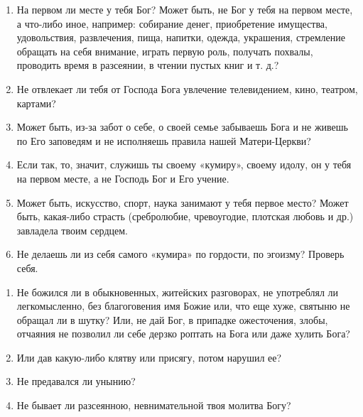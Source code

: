 \begin{mymulticols}

\begin{enumerate}

\item На первом ли месте у тебя Бог? Может быть, не Бог у тебя на первом месте, а что-либо иное, например: собирание денег, приобретение имущества, удовольствия, развлечения, пища, напитки, одежда, украшения, стремление обращать на себя внимание, играть первую роль, получать похвалы, проводить время в разсеянии, в чтении пустых книг и т. д.?

\item Не отвлекает ли тебя от Господа Бога увлечение телевидением, кино, театром, картами?

\item Может быть, из-за забот о себе, о своей семье забываешь Бога и не живешь по Его заповедям и не исполняешь правила нашей Матери-Церкви?

\item Если так, то, значит, служишь ты своему «кумиру», своему идолу, он у тебя на первом месте, а не Господь Бог и Его учение.

\item Может быть, искусство, спорт, наука занимают у тебя первое место? Может быть, какая-либо страсть (сребролюбие, чревоугодие, плотская любовь и др.) завладела твоим сердцем.

\item Не делаешь ли из себя самого «кумира» по гордости, по эгоизму? Проверь себя. 
\end{enumerate}

\end{mymulticols}

\nopagebreak

\begin{mymulticols}

\begin{enumerate}

\item Не божился ли в обыкновенных, житейских разговорах, не употреблял ли легкомысленно, без благоговения имя Божие или, что еще хуже, святыню не обращал ли в шутку? Или, не дай Бог, в припадке ожесточения, злобы, отчаяния не позволил ли себе дерзко роптать на Бога или даже хулить Бога?

\item Или дав какую-либо клятву или присягу, потом нарушил ее?

\item Не предавался ли унынию?

\item Не бывает ли разсеянною, невнимательной твоя молитва Богу? 
\end{enumerate}

\end{mymulticols}

